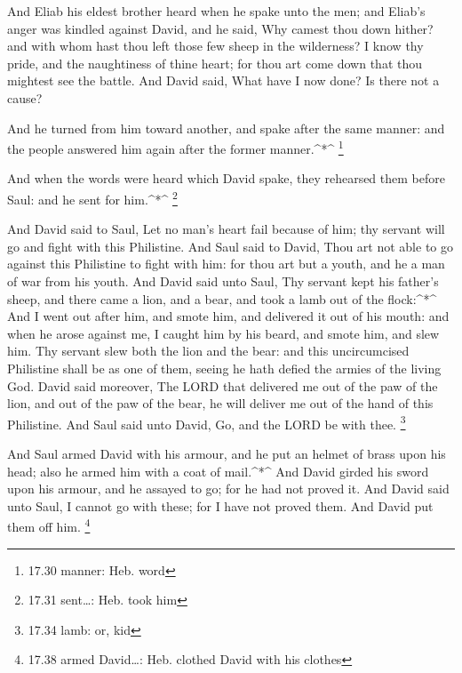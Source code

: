  And Eliab his eldest brother heard when he spake unto the
men; and Eliab's anger was kindled against David, and he said, Why
camest thou down hither? and with whom hast thou left those few sheep in
the wilderness? I know thy pride, and the naughtiness of thine heart;
for thou art come down that thou mightest see the battle. 
And David said, What have I now done? Is there not a cause?

 And he turned from him toward another, and spake after the
same manner: and the people answered him again after the former
manner.\^{}*\^{} \footnote{17.30 manner: Heb. word}

 And when the words were heard which David spake, they
rehearsed them before Saul: and he sent for him.\^{}*\^{} \footnote{17.31
  sent\ldots: Heb. took him}

 And David said to Saul, Let no man's heart fail because of
him; thy servant will go and fight with this Philistine. 
And Saul said to David, Thou art not able to go against this Philistine
to fight with him: for thou art but a youth, and he a man of war from
his youth.  And David said unto Saul, Thy servant kept his
father's sheep, and there came a lion, and a bear, and took a lamb out
of the flock:\^{}*\^{}  And I went out after him, and smote
him, and delivered it out of his mouth: and when he arose against me, I
caught him by his beard, and smote him, and slew him.  Thy
servant slew both the lion and the bear: and this uncircumcised
Philistine shall be as one of them, seeing he hath defied the armies of
the living God.  David said moreover, The LORD that
delivered me out of the paw of the lion, and out of the paw of the bear,
he will deliver me out of the hand of this Philistine. And Saul said
unto David, Go, and the LORD be with thee. \footnote{17.34 lamb: or, kid}

 And Saul armed David with his armour, and he put an helmet
of brass upon his head; also he armed him with a coat of mail.\^{}*\^{}
 And David girded his sword upon his armour, and he assayed
to go; for he had not proved it. And David said unto Saul, I cannot go
with these; for I have not proved them. And David put them off him.
\footnote{17.38 armed David\ldots: Heb. clothed David with his clothes}


